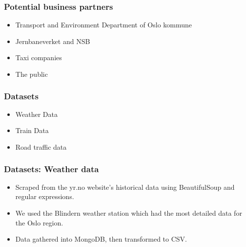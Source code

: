 \documentclass{beamer}
\begin{document}
\begin{frame}\frametitle{Potential business partners}
\begin{itemize}
\item Transport and Environment Department of Oslo kommune
\item Jernbaneverket and NSB
\item Taxi companies
\item The public%
\end{itemize}
\end{frame}




\begin{frame}\frametitle{Datasets}
\begin{itemize}
\item Weather Data
\item Train Data
\item Road traffic data
\end{itemize}

\end{frame}

\begin{frame}\frametitle{Datasets: Weather data}
\begin{itemize}
\item Scraped from the yr.no website's historical data using BeautifulSoup and regular expressions.
\item We used the Blindern weather station which had the most detailed data for the Oslo region.
\item Data gathered into MongoDB, then transformed to CSV.
\end{itemize}
\end{frame}
\end{document}
